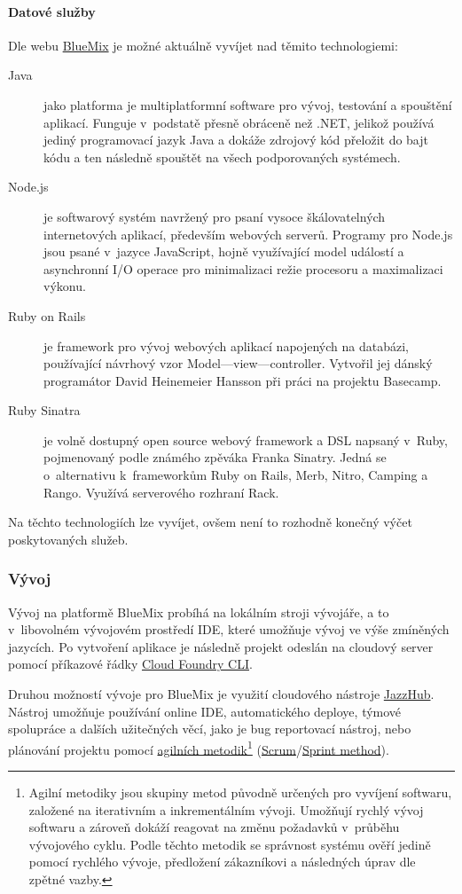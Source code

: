 \paragraph{Datové služby}
Dle webu \href{https://ace.ng.bluemix.net}{BlueMix}\cite{bluemix:web} je možné aktuálně vyvíjet nad těmito technologiemi:
\begin{description}
	\item [Java] jako platforma je multiplatformní software pro vývoj, testování a spouštění aplikací. Funguje v~podstatě přesně obráceně než .NET, jelikož používá jediný programovací jazyk Java a dokáže zdrojový kód přeložit do bajt kódu a ten následně spouštět na všech podporovaných systémech.
	\item [Node.js] je softwarový systém navržený pro psaní vysoce škálovatelných internetových aplikací, především webových serverů. Programy pro Node.js jsou psané v~jazyce JavaScript, hojně využívající model událostí a asynchronní I/O operace pro minimalizaci režie procesoru a maximalizaci výkonu.\cite{wiki:node.js}
	\item [Ruby on Rails] je framework pro vývoj webových aplikací napojených na databázi, používající návrhový vzor Model---view---controller. Vytvořil jej dánský programátor David Heinemeier Hansson při práci na projektu Basecamp.\cite{wiki:rails}
	\item [Ruby Sinatra] je volně dostupný open source webový framework a DSL napsaný v~Ruby, pojmenovaný podle známého zpěváka Franka Sinatry. Jedná se o~alternativu k~frameworkům Ruby on Rails, Merb, Nitro, Camping a Rango. Využívá serverového rozhraní Rack.\cite{wiki:sinatra}
\end{description}
Na těchto technologiích lze vyvíjet, ovšem není to rozhodně konečný výčet poskytovaných služeb.

\subsubsection{Vývoj}
Vývoj na platformě BlueMix probíhá na lokálním stroji vývojáře, a to v~libovolném vývojovém prostředí IDE, které umožňuje vývoj ve výše zmíněných jazycích. Po vytvoření aplikace je následně projekt odeslán na cloudový server pomocí příkazové řádky \href{https://github.com/cloudfoundry/cli}{Cloud Foundry CLI}.

Druhou možností vývoje pro BlueMix je využití cloudového nástroje \href{https://hub.jazz.net/}{JazzHub}. Nástroj umožňuje používání online IDE, automatického deploye, týmové spolupráce a dalších užitečných věcí, jako je bug reportovací nástroj, nebo plánování projektu pomocí \href{http://cs.wikipedia.org/wiki/Agiln\%C3\%AD_metodiky}{agilních metodik}\footnote{Agilní metodiky jsou skupiny metod původně určených pro vyvíjení softwaru, založené na iterativním a inkrementálním vývoji. Umožňují rychlý vývoj softwaru a zároveň dokáží reagovat na změnu požadavků v~průběhu vývojového cyklu. Podle těchto metodik se správnost systému ověří jedině pomocí rychlého vývoje, předložení zákazníkovi a následných úprav dle zpětné vazby.\cite{wiki:agilniMetodiky}} (\href{http://en.wikipedia.org/wiki/Scrum_(software_development)}{Scrum\cite{wiki:scrum}}/\href{http://www.sprintmethod.cz/}{Sprint method}).

